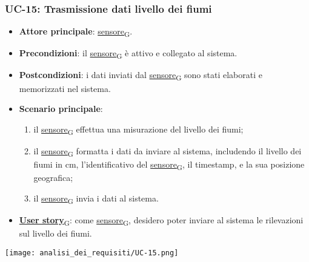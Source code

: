 \newpage
\subsubsection{UC-15: Trasmissione dati livello dei fiumi}
\begin{itemize}
	\item \textbf{Attore principale}: \href{https://7last.github.io/docs/pb/documentazione-interna/glossario\#sensore}{sensore\textsubscript{G}}.
	\item \textbf{Precondizioni}: il \href{https://7last.github.io/docs/pb/documentazione-interna/glossario\#sensore}{sensore\textsubscript{G}} è attivo e collegato al sistema.
	\item \textbf{Postcondizioni}: i dati inviati dal \href{https://7last.github.io/docs/pb/documentazione-interna/glossario\#sensore}{sensore\textsubscript{G}} sono stati elaborati e memorizzati nel sistema.
	\item \textbf{Scenario principale}:
	      \begin{enumerate}
		      \item il \href{https://7last.github.io/docs/pb/documentazione-interna/glossario\#sensore}{sensore\textsubscript{G}} effettua una misurazione del livello dei fiumi;
		      \item il \href{https://7last.github.io/docs/pb/documentazione-interna/glossario\#sensore}{sensore\textsubscript{G}} formatta i dati da inviare al sistema, includendo il livello dei fiumi in cm, l'identificativo del \href{https://7last.github.io/docs/pb/documentazione-interna/glossario\#sensore}{sensore\textsubscript{G}},
		            il timestamp, e la sua posizione geografica;
		      \item il \href{https://7last.github.io/docs/pb/documentazione-interna/glossario\#sensore}{sensore\textsubscript{G}} invia i dati al sistema.
	      \end{enumerate}
	\item \href{https://7last.github.io/docs/pb/documentazione-interna/glossario\#user-story}{\textbf{User story}\textsubscript{G}}: come \href{https://7last.github.io/docs/pb/documentazione-interna/glossario\#sensore}{sensore\textsubscript{G}}, desidero poter inviare al sistema le rilevazioni sul livello dei fiumi.
\end{itemize}
\begin{center}
	\texttt{[image: analisi\_dei\_requisiti/UC-15.png]}
\end{center}

